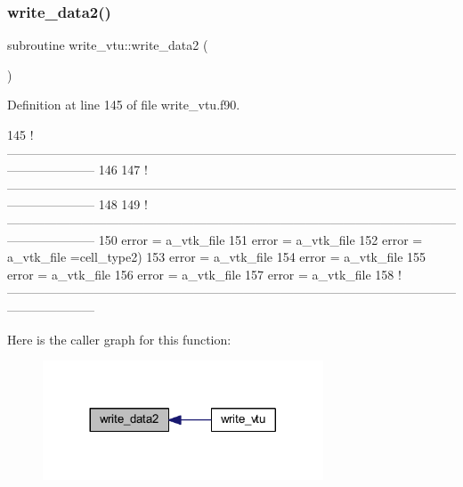 \subsubsection{\texorpdfstring{write\+\_\+data2()}{write\_data2()}}
{\footnotesize\ttfamily subroutine write\+\_\+vtu\+::write\+\_\+data2 (\begin{DoxyParamCaption}{ }\end{DoxyParamCaption})}



Definition at line 145 of file write\+\_\+vtu.\+f90.


\begin{DoxyCode}
145   \textcolor{comment}{
      !---------------------------------------------------------------------------------------------------------------------------------}
146   
147   \textcolor{comment}{
      !---------------------------------------------------------------------------------------------------------------------------------}
148 
149   \textcolor{comment}{
      !---------------------------------------------------------------------------------------------------------------------------------}
150   error = a\_vtk\_file%
151   error = a\_vtk\_file%
152   error = a\_vtk\_file%
      =cell\_type2)
153   error = a\_vtk\_file%
154   error = a\_vtk\_file%
155   error = a\_vtk\_file%
156   error = a\_vtk\_file%
157   error = a\_vtk\_file%
158   \textcolor{comment}{
      !---------------------------------------------------------------------------------------------------------------------------------}
\end{DoxyCode}
Here is the caller graph for this function\+:
\nopagebreak
\begin{figure}[H]
\begin{center}
\leavevmode
\includegraphics[width=236pt]{write__vtu_8f90_ad806107886f0521aac56740b4a2aaf62_icgraph}
\end{center}
\end{figure}
\mbox{\label{write__vtu_8f90_ab859d2be74950aa978bc251eddf0b307}} 
